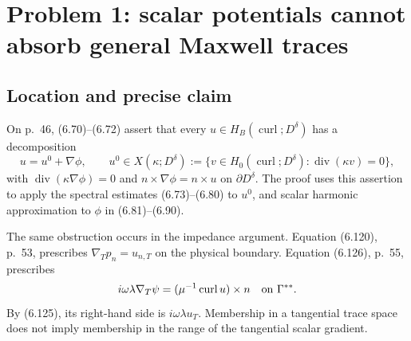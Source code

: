 \documentclass[10pt]{article}
\begin{document}
\section*{Problem 1: scalar potentials cannot absorb general Maxwell traces}
\subsection*{Location and precise claim}
On p. 46, (6.70)–(6.72) assert that every \(u\in H_B(\operatorname{curl};D^\delta)\) has a decomposition \[u=u^0+\nabla\phi,\qquad
 u^0\in X(\kappa;D^\delta)
 :=\{v\in H_0(\operatorname{curl};D^\delta):\operatorname{div}(\kappa v)=0\},\] with \(\operatorname{div}(\kappa\nabla\phi)=0\) and \(n\times\nabla\phi=n\times u\) on \(\partial D^\delta\). The proof uses this assertion to apply the spectral estimates (6.73)–(6.80) to \(u^0\), and scalar harmonic approximation to \(\phi\) in (6.81)–(6.90).\par
The same obstruction occurs in the impedance argument. Equation (6.120), p. 53, prescribes \(\nabla_Tp_n=u_{n,T}\) on the physical boundary. Equation (6.126), p. 55, prescribes \[i\omega\lambda\nabla_T\psi=(\mu^{-1}\operatorname{curl}u)\times n
 \quad\hbox{on }\Gamma^{**}.\] By (6.125), its right-hand side is \(i\omega\lambda u_T\). Membership in a tangential trace space does not imply membership in the range of the tangential scalar gradient.\par
\end{document}
